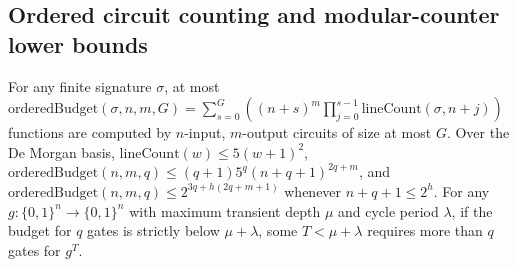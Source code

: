 \begin{result}
\subsection{Ordered circuit counting and modular-counter lower bounds}
For any finite signature $\sigma$, at most
$\mathrm{orderedBudget}(\sigma,n,m,G)=\sum_{s=0}^G((n+s)^m\prod_{j=0}^{s-1}\mathrm{lineCount}(\sigma,n+j))$
functions are computed by $n$-input, $m$-output circuits of size at most $G$. Over the De Morgan
basis, $\mathrm{lineCount}(w)\le 5(w+1)^2$, $\mathrm{orderedBudget}(n,m,q)\le(q+1)5^q(n+q+1)^{2q+m}$,
and $\mathrm{orderedBudget}(n,m,q)\le 2^{3q+h(2q+m+1)}$ whenever $n+q+1\le 2^h$. For any
$g:\{0,1\}^n\to\{0,1\}^n$ with maximum transient depth $\mu$ and cycle period $\lambda$, if the
budget for $q$ gates is strictly below $\mu+\lambda$, some $T<\mu+\lambda$ requires more than $q$
gates for $g^T$.


\end{result}
